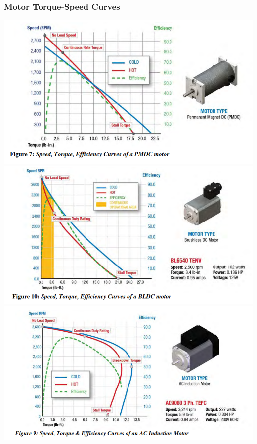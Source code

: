 \documentclass[fleqn]{beamer} %
\newcommand{\sectiontitleIII}{Motor Torque-Speed Curves}
\begin{document}
	\begin{frame}[label=sectionIII] \small
		\frametitle{\sectiontitleIII}
	 		

		\includegraphics[scale=.2]{images/torque_speed_pmdc.png}
        \includegraphics[scale=.2]{images/torque_speed_bldc.png}\includegraphics[scale=.2]{images/torque_speed_ac.png} 

		\end{frame}  
	
\end{document}
